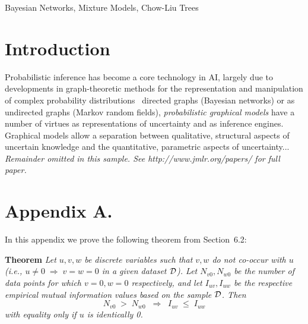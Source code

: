 \begin{keywords}
  Bayesian Networks, Mixture Models, Chow-Liu Trees
\end{keywords}

\section{Introduction}

Probabilistic inference has become a core technology in AI,
largely due to developments in graph-theoretic methods for the 
representation and manipulation of complex probability 
distributions~%
directed graphs (Bayesian networks) or as undirected graphs (Markov 
random fields), \emph{probabilistic graphical models} have a number 
of virtues as representations of uncertainty and as inference engines.  
Graphical models allow a separation between qualitative, structural
aspects of uncertain knowledge and the quantitative, parametric aspects 
of uncertainty...\\

{\noindent \em Remainder omitted in this sample. See http://www.jmlr.org/papers/ for full paper.}




\newpage

\appendix
\section*{Appendix A.}
\label{app:theorem}



In this appendix we prove the following theorem from
Section~6.2:

\noindent
{\bf Theorem} {\it Let $u,v,w$ be discrete variables such that $v, w$ do
not co-occur with $u$ (i.e., $u\neq0\;\Rightarrow \;v=w=0$ in a given
dataset ${\cal D}$). Let $N_{v0},N_{w0}$ be the number of data points for
which $v=0, w=0$ respectively, and let $I_{uv},I_{uw}$ be the
respective empirical mutual information values based on the sample
${\cal D}$. Then
\[
	N_{v0} \;>\; N_{w0}\;\;\Rightarrow\;\;I_{uv} \;\leq\;I_{uw}
\]
with equality only if $u$ is identically 0.} \hfill\BlackBox

